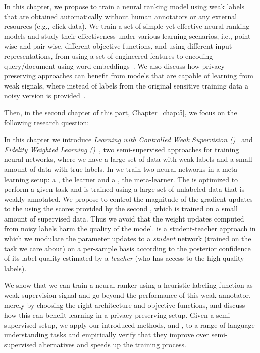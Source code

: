 In this chapter, we propose to train a neural ranking model using weak labels that are obtained automatically without human annotators or any external resources (e.g., click data). We train a set of simple yet effective neural ranking models and study their effectiveness under various learning scenarios, i.e., point-wise and pair-wise, different objective functions, and using different input representations, from using a set of engineered features to encoding query/document using word embeddings~\citep{Dehghani:2017:SIGIR}. We also discuss how privacy preserving approaches can benefit from models that are capable of learning from weak signals, where instead of labels from the original sensitive training data a noisy version is provided~\citep{dehghani:2017:neuir}.

Then, in the second chapter of this part, Chapter~\ref{chap:5}, we focus on the following research question:

In this chapter we introduce \emph{Learning with Controlled Weak Supervision (\cws)}~\cite{Dehghani:2017:nips_metalearn, Dehghani:2017avoiding} and \emph{Fidelity Weighted Learning (\fwl)}~\citep{dehghani:2018:ICLR,Dehghani:2019:ICLR-LLD}, two semi-supervised approaches for training neural networks, where we have a large set of data with weak labels and a small amount of data with true labels. 
%
In \cws we train two neural networks in a meta-learning setup: a \tnet, the learner and a \cnet, the meta-learner.  The \tnet is optimized to perform a given task and is trained using a large set of unlabeled data that is weakly annotated. We propose to control the magnitude of the gradient updates to the \tnet using the scores provided by the second \cnet, which is trained on a small amount of supervised data. Thus we avoid that the weight updates computed from noisy labels harm the quality of the \tnet model.
%
\fwl is a student-teacher approach in which we modulate the parameter updates to a \emph{student} network (trained on the task we care about) on a per-sample basis according to the posterior confidence of its label-quality estimated by a \emph{teacher} (who has access to the high-quality labels).  


We show that we can train a neural ranker using a heuristic labeling function as weak supervision signal and go beyond the performance of this weak annotator, merely by choosing the right architecture and objective functions, and discuss how this can benefit learning in a privacy-preserving setup.
Given a semi-supervised setup, we apply our introduced methods, \cws and \fwl, to a range of language understanding tasks and empirically verify that they improve over semi-supervised alternatives and speeds up the training process. 

\medskip


